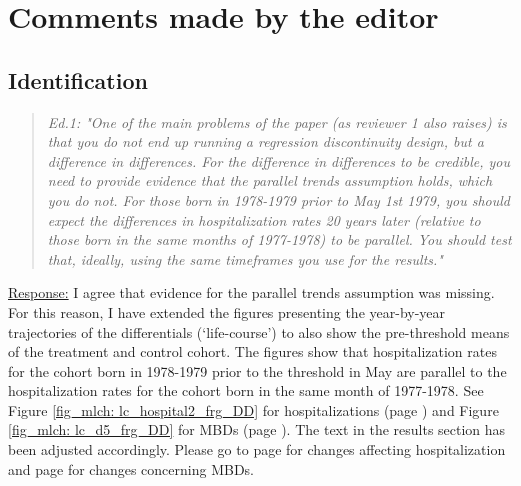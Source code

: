
\clearpage
\section{Comments made by the editor}

\subsection{Identification}

{}
\begin{quote}
\textit{Ed.1: "One of the main problems of the paper (as reviewer 1 also raises) is that you do not end up running a regression discontinuity design, but a difference in differences. For the difference in differences to be credible, you need to provide evidence that the parallel trends assumption holds, which you do not. For those born in 1978-1979 prior to May 1st 1979, you should expect the differences in hospitalization rates 20 years later (relative to those born in the same months of 1977-1978) to be parallel. You should test that, ideally, using the same timeframes you use for the results."}
\end{quote}

\underline{Response:} I agree that evidence for the parallel trends assumption was missing. For this reason, I have extended the figures presenting the year-by-year trajectories of the differentials (`life-course') to also show the pre-threshold means of the treatment and control cohort. The figures show that hospitalization rates for the cohort born in 1978-1979 prior to the threshold in May are parallel to the hospitalization rates for the cohort born in the same month of 1977-1978. See Figure \ref{fig_mlch: lc_hospital2_frg_DD} for hospitalizations (page \pageref{fig_mlch: lc_hospital2_frg_DD}) and Figure \ref{fig_mlch: lc_d5_frg_DD} for MBDs (page \pageref{fig_mlch: lc_d5_frg_DD}). The text in the results section has been adjusted accordingly. Please go to page \pageref{rev_mlch: editor_parallel_trends_text} for changes affecting hospitalization and page \pageref{rev_mlch: editor_parallel_trends_text_d5} for changes concerning MBDs.





